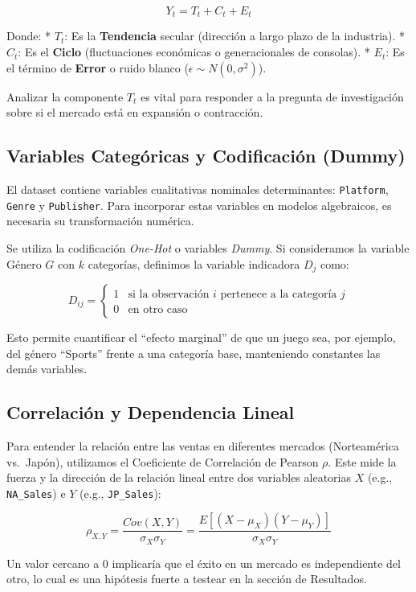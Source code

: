 \documentclass[oneside,11pt]{Latex/Classes/PhDthesisPSnPDF}
\begin{document}
\[Y_t = T_t + C_t + E_t\]

Donde: * \(T_t\): Es la \textbf{Tendencia} secular (dirección a largo
plazo de la industria). * \(C_t\): Es el \textbf{Ciclo} (fluctuaciones
económicas o generacionales de consolas). * \(E_t\): Es el término de
\textbf{Error} o ruido blanco (\(\epsilon \sim N(0, \sigma^2)\)).

Analizar la componente \(T_t\) es vital para responder a la pregunta de
investigación sobre si el mercado está en expansión o contracción.

\subsection{Variables Categóricas y Codificación (Dummy)}

El dataset contiene variables cualitativas nominales determinantes:
\texttt{Platform}, \texttt{Genre} y \texttt{Publisher}. Para incorporar
estas variables en modelos algebraicos, es necesaria su transformación
numérica.

Se utiliza la codificación \emph{One-Hot} o variables \emph{Dummy}. Si
consideramos la variable Género \(G\) con \(k\) categorías, definimos la
variable indicadora \(D_j\) como:

\[
D_{ij} = \begin{cases} 
1 & \text{si la observación } i \text{ pertenece a la categoría } j \\
0 & \text{en otro caso}
\end{cases}
\]

Esto permite cuantificar el ``efecto marginal'' de que un juego sea, por
ejemplo, del género ``Sports'' frente a una categoría base, manteniendo
constantes las demás variables.

\subsection{Correlación y Dependencia Lineal}

Para entender la relación entre las ventas en diferentes mercados
(Norteamérica vs.~Japón), utilizamos el Coeficiente de Correlación de
Pearson \(\rho\). Este mide la fuerza y la dirección de la relación
lineal entre dos variables aleatorias \(X\) (e.g., \texttt{NA\_Sales}) e
\(Y\) (e.g., \texttt{JP\_Sales}):

\[\rho_{X,Y} = \frac{Cov(X,Y)}{\sigma_X \sigma_Y} = \frac{E[(X - \mu_X)(Y - \mu_Y)]}{\sigma_X \sigma_Y}\]

Un valor cercano a 0 implicaría que el éxito en un mercado es
independiente del otro, lo cual es una hipótesis fuerte a testear en la
sección de Resultados.
\end{document}
